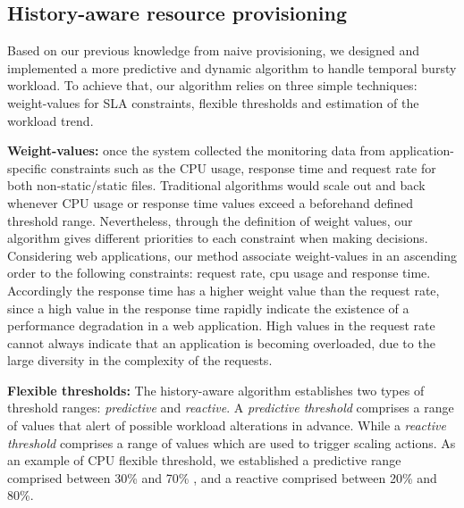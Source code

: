 

\subsection{History-aware resource provisioning}
Based on our previous knowledge from naive provisioning, we designed and implemented a more predictive and dynamic algorithm to handle temporal bursty workload. To achieve that, our algorithm relies on three simple techniques: weight-values for SLA constraints, flexible thresholds and  estimation of the workload trend. 


\textbf{Weight-values:} once the system collected the monitoring data from application-specific constraints such as the CPU usage, response time and request rate for both non-static/static files. Traditional algorithms would scale out and back whenever CPU usage or response time values  exceed a beforehand defined threshold range. Nevertheless,  through the definition of weight values, our algorithm gives different priorities to each constraint when making decisions. 
Considering web applications, our method associate weight-values in an ascending order to the following constraints: request rate, cpu usage and response time. Accordingly the response time has a higher weight value than the request rate, since a high value in the response time rapidly indicate the existence of a performance degradation in a web application. High values in the request rate cannot always indicate that an application is becoming overloaded, due to the large diversity in the complexity of the requests.

\textbf{Flexible thresholds:} The history-aware algorithm establishes two types of threshold ranges: \emph{predictive} and \emph{reactive}. A \emph{predictive threshold} comprises a range of values that alert of possible workload alterations in advance. While a \emph{reactive threshold} comprises a range of values which are used to trigger scaling actions. As an example of CPU flexible threshold, we established a predictive range comprised between 30\% and 70\% , and a reactive comprised between 20\% and 80\%.  

